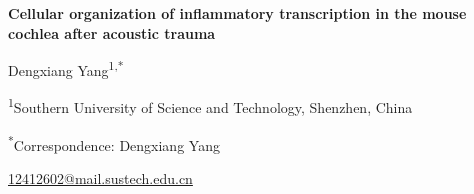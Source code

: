 

\begin{center}
{\LARGE\bfseries Cellular organization of inflammatory transcription in the mouse cochlea after acoustic trauma\par}
\vspace{14pt}
{\large Dengxiang Yang\textsuperscript{1,*}\par}
\vspace{7pt}
\textsuperscript{1}Southern University of Science and Technology, Shenzhen, China\par
\vspace{7pt}
\textsuperscript{*}Correspondence: Dengxiang Yang\par
\href{mailto:12412602@mail.sustech.edu.cn}{12412602@mail.sustech.edu.cn}
\end{center}
\vspace{6pt}

\linenumbers

\clearpage





\clearpage
\begingroup
\small
\linespread{1.0}\selectfont
\setlength{\bibsep}{3pt}


\endgroup

\clearpage
\nolinenumbers


